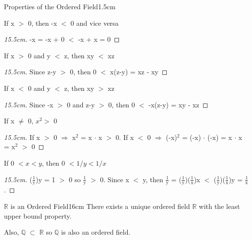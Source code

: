 	\vspace{0.4cm}



	\begin{ltheorem}{Properties of the Ordered Field}{1.5cm}
		\item If x $>$ 0, then -x $<$ 0 and vice versa
	
			\begin{proof}[15.5cm]
				-x = -x + 0 $<$ -x + x = 0
			\end{proof}

		\item If x $>$ 0 and y $<$ z, then xy $<$ xz
	
			\begin{proof}[15.5cm]
				Since z-y $>$ 0, then 0 $<$ x(z-y) = xz - xy
			\end{proof}

		\item If x $ < $ 0 and y $ < $ z, then xy $ > $ xz

			\begin{proof}[15.5cm]
				Since -x $>$ 0 and z-y $>$ 0, then 0 $<$ -x(z-y) = xy - xz
			\end{proof}
	
		\item If x $\neq$ 0, $x^2 > $ 0

			\begin{proof}[15.5cm]
				If x $>$ 0 $\Rightarrow$ x$^\text{2}$ = x $\cdot$ x $>$ 0.
				If x $<$ 0 $\Rightarrow$ (-x)$^\text{2}$ = (-x) $\cdot$ (-x)
				= x $\cdot$ x = x$^\text{2}$ $>$ 0
			\end{proof}
	
		\item If 0 $< x < y$, then 0 $< 1/y < 1/x$

			\begin{proof}[15.5cm]
				($\frac{1}{\text{y}}$)y = 1 $>$ 0 so
				$\frac{1}{\text{y}}$ $>$ 0.				
				Since x $<$ y, then $\frac{1}{\text{y}}$
				= ($\frac{1}{\text{y}}$)($\frac{1}{\text{x}}$)x
				$<$ ($\frac{1}{\text{y}}$)($\frac{1}{\text{x}}$)y
				= $\frac{1}{\text{x}}$.
			\end{proof}
	\end{ltheorem}

	\newpage



	\begin{wtheorem}{$\mathbb{R}$ is an Ordered Field}{16cm}
		There exists a unique ordered field $\mathbb{R}$ with the
		least upper bound property.

		Also, $\mathbb{Q}$  $\subset$ $\mathbb{R}$ so $\mathbb{Q}$ is
		also an ordered field.
	\end{wtheorem}

